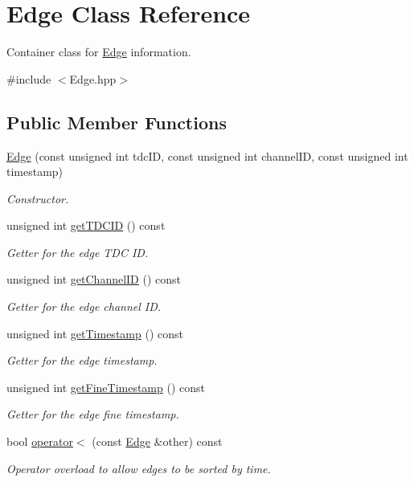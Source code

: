 \hypertarget{class_edge}{}\section{Edge Class Reference}
\label{class_edge}


Container class for \hyperlink{class_edge}{Edge} information.  




{\ttfamily \#include $<$Edge.\+hpp$>$}

\subsection*{Public Member Functions}
\begin{DoxyCompactItemize}
\item 
\hyperlink{class_edge_afdb566fe3d71b657aa3211783c336a6d}{Edge} (const unsigned int tdc\+ID, const unsigned int channel\+ID, const unsigned int timestamp)
\begin{DoxyCompactList}\small\item\em Constructor. \end{DoxyCompactList}\item 
unsigned int \hyperlink{class_edge_a43d8c30ccdc68a6f7a37bb0163b6829d}{get\+T\+D\+C\+ID} () const
\begin{DoxyCompactList}\small\item\em Getter for the edge T\+DC ID. \end{DoxyCompactList}\item 
unsigned int \hyperlink{class_edge_a5420f88056570dc33c697c99a211634c}{get\+Channel\+ID} () const
\begin{DoxyCompactList}\small\item\em Getter for the edge channel ID. \end{DoxyCompactList}\item 
unsigned int \hyperlink{class_edge_a463ea176ce520b5a280a15b15b41dd1e}{get\+Timestamp} () const
\begin{DoxyCompactList}\small\item\em Getter for the edge timestamp. \end{DoxyCompactList}\item 
unsigned int \hyperlink{class_edge_a67a04612cd6037408c691ab35d076ed7}{get\+Fine\+Timestamp} () const
\begin{DoxyCompactList}\small\item\em Getter for the edge fine timestamp. \end{DoxyCompactList}\item 
bool \hyperlink{class_edge_ab6a06c5da57efed1991960f61e870c8b}{operator$<$} (const \hyperlink{class_edge}{Edge} \&other) const
\begin{DoxyCompactList}\small\item\em Operator overload to allow edges to be sorted by time. \end{DoxyCompactList}\end{DoxyCompactItemize}
